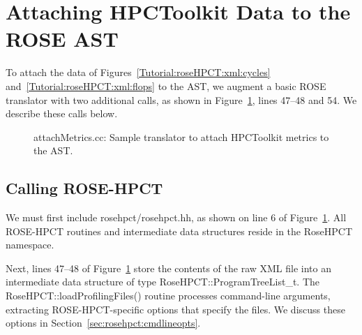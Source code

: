 \clearpage
\section{Attaching HPCToolkit Data to the ROSE AST}
\label{chap:rosehpct:attach}

To attach the data of Figures~\ref{Tutorial:roseHPCT:xml:cycles}
and~\ref{Tutorial:roseHPCT:xml:flops} to the AST, we augment a basic
ROSE translator with two additional calls, as shown in
Figure~\ref{Tutorial:roseHPCT:attach}, lines 47--48 and 54. We
describe these calls below.

\begin{figure}[!h]
{\indent
{\mySmallFontSize


\begin{latexonly}
   
\end{latexonly}

\begin{htmlonly}
   
\end{htmlonly}

}
}
\caption{attachMetrics.cc: Sample translator to attach HPCToolkit metrics to the AST.}
\label{Tutorial:roseHPCT:attach}
\end{figure}

\subsection{Calling ROSE-HPCT}

We must first include rosehpct/rosehpct.hh, as shown on line 6 of
Figure~\ref{Tutorial:roseHPCT:attach}. All ROSE-HPCT routines and
intermediate data structures reside in the RoseHPCT namespace.

Next, lines 47--48 of Figure~\ref{Tutorial:roseHPCT:attach} store the
contents of the raw XML file into an intermediate data structure of
type RoseHPCT::ProgramTreeList\_t. The RoseHPCT::loadProfilingFiles()
routine processes command-line arguments, extracting
ROSE-HPCT-specific options that specify the files. We discuss these
options in Section~\ref{sec:rosehpct:cmdlineopts}.

